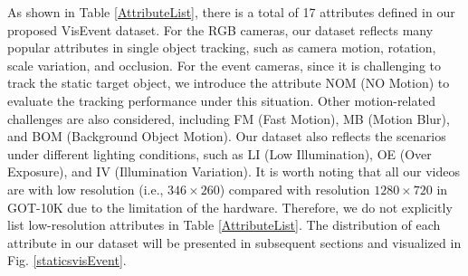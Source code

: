 \documentclass[journal]{IEEEtran}
\begin{document}
As shown in Table \ref{AttributeList}, there is a total of 17 attributes defined in our proposed VisEvent dataset. For the RGB cameras, our dataset reflects many popular attributes in single object tracking, such as camera motion, rotation, scale variation, and occlusion. For the event cameras, since it is challenging to track the static target object, we introduce the attribute NOM (NO Motion) to evaluate the tracking performance under this situation. Other motion-related challenges are also considered, including FM (Fast Motion), MB (Motion Blur), and BOM (Background Object Motion). Our dataset also reflects the scenarios under different lighting conditions, such as LI (Low Illumination), OE (Over Exposure), and IV (Illumination Variation). It is worth noting that all our videos are with low resolution (i.e., $346 \times 260$) compared with resolution $1280 \times 720$ in GOT-10K \cite{huang2019got10k} due to the limitation of the hardware. Therefore, we do not explicitly list low-resolution attributes in Table \ref{AttributeList}. The distribution of each attribute in our dataset will be presented in subsequent sections and visualized in Fig. \ref{staticsvisEvent}. 
\end{document}
